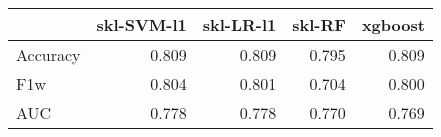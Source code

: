 \begin{tabular}{lrrrr}
\toprule
{} &  skl-SVM-l1 &  skl-LR-l1 &  skl-RF &  xgboost \\
\midrule
Accuracy &       0.809 &      0.809 &   0.795 &    0.809 \\
F1w      &       0.804 &      0.801 &   0.704 &    0.800 \\
AUC      &       0.778 &      0.778 &   0.770 &    0.769 \\
\bottomrule
\end{tabular}
